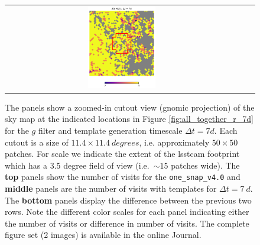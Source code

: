 \documentclass[preprintm,linenumbers]{aastex631}
\newcommand{\baseline}{\texttt{one\_snap\_v4.0}\xspace}
\begin{document}
\begin{figure}
\begin{tabular}{  c c c}
				\includegraphics[width=0.3\textwidth]{results/skymaps_cutout/skymaps_cutout_delta_first_year_one_snap_v4_0_10yrs_db_noDD_noTwi_tscale-7_nside-256_doAllTemplateMetrics_reduceCount_g_GP_noDD_noTwi.pdf} \\
			\end{tabular}
			\caption{
				The panels show a zoomed-in cutout view (gnomic projection) of the sky map at the indicated locations in Figure \ref{fig:all_together_r_7d} for the $g$ filter and template generation timescale $\Delta t = 7 \si{d}$.
				Each cutout is a size of $11.4 \times 11.4\ \si{degrees}$, i.e. approximately $50 \times 50$ patches.
				For scale we indicate the extent of the \gls*{lsstcam} footprint which has a 3.5 degree field of view (i.e.\ $\sim15$ patches wide).
The \textbf{top} panels show the number of visits for the \baseline and \textbf{middle} panels are the number of visits with templates for $\Delta t = 7\ \si{d}$.
The \textbf{bottom} panels display the difference between the previous two rows.
				Note the different color scales for each panel indicating either the number of visits or difference in number of visits. 	
              The complete figure set (2 images) is available in the online Journal. 
    }
	\label{fig:skymap_cutouts_g_7}
		\end{figure}
\end{document}
